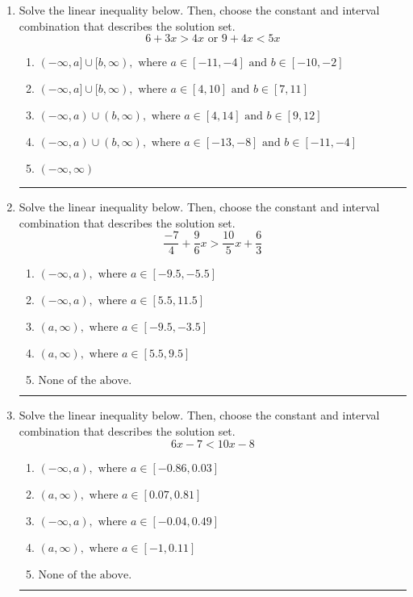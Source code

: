 \documentclass[14pt]{extbook}
\newcommand{\litem}[1]{\item#1\hspace*{-1cm}\rule{\textwidth}{0.4pt}}
\begin{document}
\begin{enumerate}
{\begin{enumerate}[label=\Alph*.]
\end{enumerate} }
\litem{
Solve the linear inequality below. Then, choose the constant and interval combination that describes the solution set.\[ 6 + 3 x > 4 x \text{ or } 9 + 4 x < 5 x \]\begin{enumerate}[label=\Alph*.]
\item \( (-\infty, a] \cup [b, \infty), \text{ where } a \in [-11, -4] \text{ and } b \in [-10, -2] \)
\item \( (-\infty, a] \cup [b, \infty), \text{ where } a \in [4, 10] \text{ and } b \in [7, 11] \)
\item \( (-\infty, a) \cup (b, \infty), \text{ where } a \in [4, 14] \text{ and } b \in [9, 12] \)
\item \( (-\infty, a) \cup (b, \infty), \text{ where } a \in [-13, -8] \text{ and } b \in [-11, -4] \)
\item \( (-\infty, \infty) \)

\end{enumerate} }
\litem{
Solve the linear inequality below. Then, choose the constant and interval combination that describes the solution set.\[ \frac{-7}{4} + \frac{9}{6} x > \frac{10}{5} x + \frac{6}{3} \]\begin{enumerate}[label=\Alph*.]
\item \( (-\infty, a), \text{ where } a \in [-9.5, -5.5] \)
\item \( (-\infty, a), \text{ where } a \in [5.5, 11.5] \)
\item \( (a, \infty), \text{ where } a \in [-9.5, -3.5] \)
\item \( (a, \infty), \text{ where } a \in [5.5, 9.5] \)
\item \( \text{None of the above}. \)

\end{enumerate} }
\litem{
Solve the linear inequality below. Then, choose the constant and interval combination that describes the solution set.\[ 6x -7 < 10x -8 \]\begin{enumerate}[label=\Alph*.]
\item \( (-\infty, a), \text{ where } a \in [-0.86, 0.03] \)
\item \( (a, \infty), \text{ where } a \in [0.07, 0.81] \)
\item \( (-\infty, a), \text{ where } a \in [-0.04, 0.49] \)
\item \( (a, \infty), \text{ where } a \in [-1, 0.11] \)
\item \( \text{None of the above}. \)


\end{enumerate}}
\end{enumerate}
\end{document}
